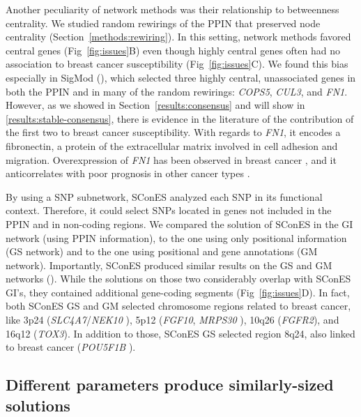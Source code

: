 \documentclass[10pt,letterpaper]{article}
\begin{document}
Another peculiarity of network methods was their relationship to betweenness centrality. We studied random rewirings of the PPIN that preserved node centrality (Section~\ref{methods:rewiring}). In this setting, network methods favored central genes (Fig~\ref{fig:issues}B) even though highly central genes often had no association to breast cancer susceptibility (Fig~\ref{fig:issues}C). We found this bias especially in SigMod (), which selected three highly central, unassociated genes in both the PPIN and in many of the random rewirings: \emph{COPS5}, \emph{CUL3}, and \emph{FN1}. However, as we showed in Section~\ref{results:consensus} and will show in \ref{results:stable-consensus}, there is evidence in the literature of the contribution of the first two to breast cancer susceptibility. With regards to \emph{FN1}, it encodes a fibronectin, a protein of the extracellular matrix involved in cell adhesion and migration. Overexpression of \emph{FN1} has been observed in breast cancer \cite{Ioachim2002}, and it anticorrelates with poor prognosis in other cancer types \cite{Yi2016,Sponziello2016}.

By using a SNP subnetwork, SConES analyzed each SNP in its functional context. Therefore, it could select SNPs located in genes not included in the PPIN and in non-coding regions. We compared the solution of SConES in the GI network (using PPIN information), to the one using only positional information (GS network) and to the one using positional and gene annotations (GM network). Importantly, SConES produced similar results on the GS and GM networks (). While the solutions on those two considerably overlap with SConES GI's, they contained additional gene-coding segments (Fig~\ref{fig:issues}D). In fact, both SConES GS and GM selected chromosome regions related to breast cancer, like 3p24 (\emph{SLC4A7}/\emph{NEK10} \cite{ahmed_newly_2009}), 5p12 (\emph{FGF10}, \emph{MRPS30} \cite{quigley_5p12_2014}), 10q26 (\emph{FGFR2}), and 16q12 (\emph{TOX3}). In addition to those, SConES GS selected region 8q24, also linked to breast cancer (\emph{POU5F1B} \cite{breyer_expressed_2014}). 

\subsection{Different parameters produce similarly-sized solutions}
\label{results:parameters}
\end{document}

